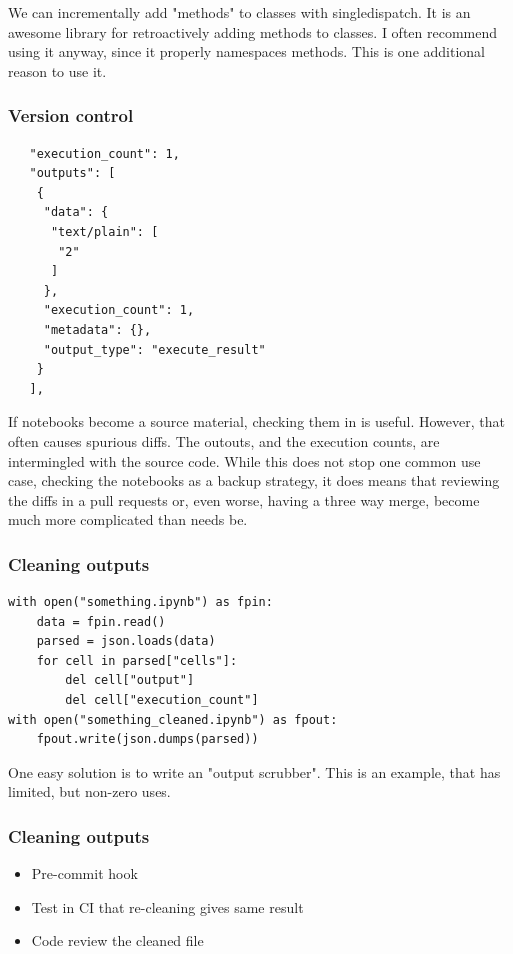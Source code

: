We can incrementally add "methods" to classes with singledispatch.
It is an awesome library for retroactively adding methods to classes.
I often recommend using it anyway,
since it properly namespaces methods.
This is one additional reason to use it.

\begin{frame}[fragile]
\frametitle{Version control}

\begin{lstlisting}
   "execution_count": 1,
   "outputs": [
    {
     "data": {
      "text/plain": [
       "2"
      ]
     },
     "execution_count": 1,
     "metadata": {},
     "output_type": "execute_result"
    }
   ],
\end{lstlisting}

\end{frame}

If notebooks become a source material,
checking them in is useful.
However,
that often causes spurious diffs.
The outouts,
and the execution counts,
are intermingled with the source code.
While this does not stop one common use case,
checking the notebooks as a backup strategy,
it does means that reviewing the diffs
in a pull requests or,
even worse,
having a three way merge,
become much more complicated than needs be.

\begin{frame}[fragile]
\frametitle{Cleaning outputs}

\begin{lstlisting}
with open("something.ipynb") as fpin:
    data = fpin.read()
    parsed = json.loads(data)
    for cell in parsed["cells"]:
        del cell["output"]
        del cell["execution_count"]
with open("something_cleaned.ipynb") as fpout:
    fpout.write(json.dumps(parsed))
\end{lstlisting}

\end{frame}

One easy solution is to write an "output scrubber".
This is an example,
that has limited,
but non-zero uses.

\begin{frame}
\frametitle{Cleaning outputs}

\begin{itemize}
\item Pre-commit hook
\item Test in CI that re-cleaning gives same result
\item Code review the cleaned file
\end{itemize}

\end{frame}

